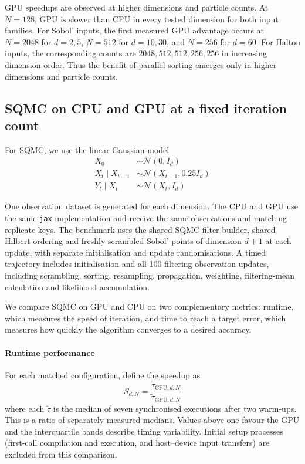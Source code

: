 GPU speedups are observed at higher dimensions and particle counts. At $N=128$, GPU is slower than CPU in every tested dimension for both input families. For Sobol' inputs, the first measured GPU advantage occurs at $N=2048$ for $d=2,5$, $N=512$ for $d=10,30$, and $N=256$ for $d=60$. For Halton inputs, the corresponding counts are $2048,512,512,256,256$ in increasing dimension order. Thus the benefit of parallel sorting emerges only in higher dimensions and particle counts.

\subsection{SQMC on CPU and GPU at a fixed iteration count}
\label{sec:sqmc-cpu-gpu}

For SQMC, we use the linear Gaussian model
\begin{align}
    X_0 &\sim \mathcal{N}(0,I_d) \nonumber \\
    X_t\mid X_{t-1} &\sim \mathcal{N}(X_{t-1},0.25I_d) \nonumber \\
    Y_t\mid X_t &\sim \mathcal{N}(X_t,I_d) \nonumber
\end{align}

One observation dataset is generated for each dimension. The CPU and GPU use the same \texttt{jax} implementation and receive the same observations and matching replicate keys. The benchmark uses the shared SQMC filter builder, shared Hilbert ordering and freshly scrambled Sobol' points of dimension $d+1$ at each update, with separate initialisation and update randomisations. A timed trajectory includes initialisation and all 100 filtering observation updates, including scrambling, sorting, resampling, propagation, weighting, filtering-mean calculation and likelihood accumulation.

We compare SQMC on GPU and CPU on two complementary metrics: runtime, which measures the speed of iteration, and time to reach a target error, which measures how quickly the algorithm converges to a desired accuracy.

\paragraph{Runtime performance}

For each matched configuration, define the speedup as
\begin{equation}
    S_{d,N}=\frac{\widetilde\tau_{\mathrm{CPU},d,N}}{\widetilde\tau_{\mathrm{GPU},d,N}} \nonumber
    \label{eq:sqmc-fixed-work-speedup}
\end{equation}
where each $\widetilde\tau$ is the median of seven synchronised executions after two warm-ups. This is a ratio of separately measured medians. Values above one favour the GPU and the interquartile bands describe timing variability. Initial setup processes (first-call compilation and execution, and host--device input transfers) are excluded from this comparison.

